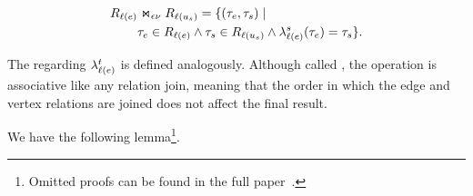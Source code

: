 \begin{equation} \label{eq:ev-join}
\begin{split}
R_{\mathcal{\ell}(e)} & \Join_{\epsilon\nu} R_{\mathcal{\ell}(u_s)} = \{(\tau_e, \tau_s) \;|\; \\
  &  \tau_e \in R_{\mathcal{\ell}(e)} \land \tau_s \in R_{\mathcal{\ell}(u_s)} \land \lambda_{\mathcal{\ell}(e)}^s(\tau_e) = \tau_s\}.
\end{split}
\end{equation}

The \EVjoin regarding $\lambda_{\mathcal{\ell}(e)}^t$ is defined analogously. Although called \EVjoin, the operation is associative like any relation join, meaning that the order in which the edge and vertex relations are joined does not affect the final result.


We have the following lemma\footnote{Omitted proofs can be found in the full paper~\cite{full-paper}.}.

